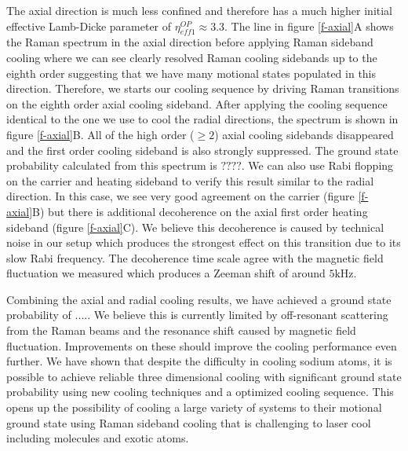 \documentclass[aps,prl,twocolumn,groupedaddress]{revtex4-1}
\begin{document}
The axial direction is much less confined and therefore has a much higher initial effective
Lamb-Dicke parameter of $\eta^{OP}_{eff1}\approx3.3$.
The line in figure \ref{f-axial}A shows the Raman spectrum in the axial direction
before applying Raman sideband cooling where we can see clearly resolved Raman cooling sidebands
up to the eighth order suggesting that we have many motional states populated in this direction.
Therefore, we starts our cooling sequence by driving Raman transitions on the eighth order axial
cooling sideband. After applying the cooling sequence identical to the one we use to cool
the radial directions, the spectrum is shown in figure \ref{f-axial}B.
All of the high order ($\geqslant2$) axial cooling sidebands disappeared and the first order
cooling sideband is also strongly suppressed.
The ground state probability calculated from this spectrum is $????$.
We can also use Rabi flopping on the carrier and heating sideband to verify this result
similar to the radial direction. In this case, we see very good agreement on the carrier
(figure \ref{f-axial}B) but there is additional decoherence on the axial first order
heating sideband (figure \ref{f-axial}C).
We believe this decoherence is caused by technical noise in our setup which
produces the strongest effect on this transition due to its slow Rabi frequency.
The decoherence time scale agree with the magnetic field fluctuation we measured which produces
a Zeeman shift of around $5\text{kHz}$.

Combining the axial and radial cooling results,
we have achieved a ground state probability of $....$.
We believe this is currently limited by off-resonant scattering from the Raman beams
and the resonance shift caused by magnetic field fluctuation.
Improvements on these should improve the cooling performance even further.
We have shown that despite the difficulty in cooling sodium atoms,
it is possible to achieve reliable three dimensional cooling with significant ground state
probability using new cooling techniques and a optimized cooling sequence.
This opens up the possibility of cooling a large variety of systems to their motional ground
state using Raman sideband cooling that is challenging to laser cool
including molecules and exotic atoms.



\end{document}
